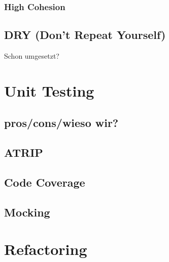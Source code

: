 \documentclass{article}
\begin{document}
\subsubsection{High Cohesion}
\subsection{DRY (Don't Repeat Yourself)}
Schon umgesetzt?


\section{Unit Testing}
\subsection{pros/cons/wieso wir?}
\subsection{ATRIP}
\subsection{Code Coverage}
\subsection{Mocking}

\section{Refactoring}
\end{document}
